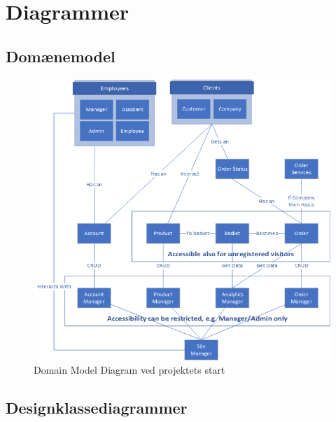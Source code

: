 \chapter{Diagrammer}
\label{appendix:diagrams}

\section{Domænemodel}
\label{appendix:domain-model-diagram}

\begin{figure}
    \centering
    \includegraphics[width=1\textwidth]{figures/diagrams/dmd-start.png}
    \caption{Domain Model Diagram ved projektets start}
    \label{fig:appendix-domain-model-diagram}
\end{figure}

\section{Designklassediagrammer}
\label{appendix:class-diagrams}


